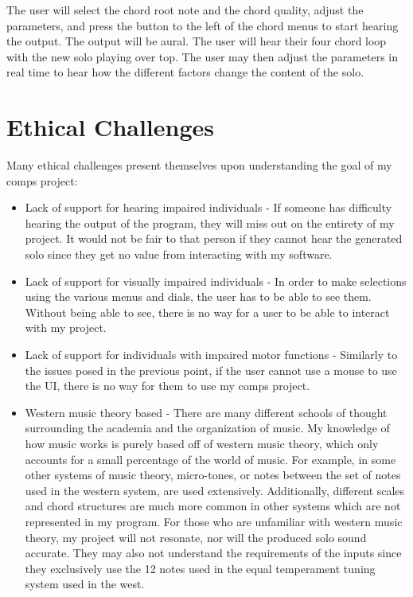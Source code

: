 \documentclass[10pt,twocolumn]{article}
\begin{document}
    The user will select the chord root note and the chord quality, adjust the parameters, and press the button to the left of the chord menus to start hearing the output. The output will be aural. The user will hear their four chord loop with the new solo playing over top. The user may then adjust the parameters in real time to hear how the different factors change the content of the solo.

\section{Ethical Challenges}
    Many ethical challenges present themselves upon understanding the goal of my comps project:
    \begin{itemize}
        \item Lack of support for hearing impaired individuals - 
        \newline If someone has difficulty hearing the output of the program, they will miss out on the entirety of my project. It would not be fair to that person if they cannot hear the generated solo since they get no value from interacting with my software.
        \item Lack of support for visually impaired individuals -
        \newline In order to make selections using the various menus and dials, the user has to be able to see them. Without being able to see, there is no way for a user to be able to interact with my project.
        \item Lack of support for individuals with impaired motor functions -
        \newline Similarly to the issues posed in the previous point, if the user cannot use a mouse to use the UI, there is no way for them to use my comps project. 
        \item Western music theory based -
        \newline There are many different schools of thought surrounding the academia and the organization of music. My knowledge of how music works is purely based off of western music theory, which only accounts for a small percentage of the world of music. For example, in some other systems of music theory, micro-tones, or notes between the set of notes used in the western system, are used extensively. Additionally, different scales and chord structures are much more common in other systems which are not represented in my program. For those who are unfamiliar with western music theory, my project will not resonate, nor will the produced solo sound accurate. They may also not understand the requirements of the inputs since they exclusively use the 12 notes used in the equal temperament tuning system used in the west.

\end{itemize}
\end{document}
